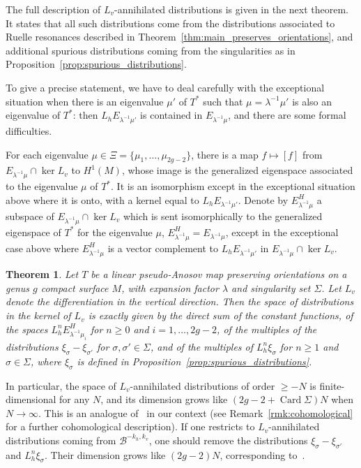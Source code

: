 \documentclass[10pt]{amsart}
\newcommand{\boB}{\mathcal{B}}
\DeclareMathOperator{\Card}{Card}
\newtheorem{thm}{Theorem}[section]
\theoremstyle{definition}
\numberwithin{equation}{section}
\begin{document}
The full description of $L_v$-annihilated distributions is given in the next
theorem. It states that all such distributions come from the distributions
associated to Ruelle resonances described in
Theorem~\ref{thm:main_preserves_orientations}, and additional spurious
distributions coming from the singularities as in
Proposition~\ref{prop:spurious_distributions}.

To give a precise statement, we have to deal carefully with the exceptional
situation when there is an eigenvalue $\mu'$ of $T^*$ such that
$\mu=\lambda^{-1}\mu'$ is also an eigenvalue of $T^*$: then $L_h
E_{\lambda^{-1}\mu'}$ is contained in $E_{\lambda^{-1}\mu}$, and there are
some formal difficulties.

For each eigenvalue $\mu \in \Xi = \{\mu_1,\dotsc, \mu_{2g-2}\}$, there is a
map $f \mapsto [f]$ from $E_{\lambda^{-1}\mu} \cap \ker L_v$ to $H^1(M)$,
whose image is the generalized eigenspace associated to the eigenvalue $\mu$
of $T^*$. It is an isomorphism except in the exceptional situation above
where it is onto, with a kernel equal to $L_h E_{\lambda^{-1}\mu'}$. Denote
by $E_{\lambda^{-1}\mu}^H$ a subspace of $E_{\lambda^{-1}\mu}\cap \ker L_v$
which is sent isomorphically to the generalized eigenspace of $T^*$ for the
eigenvalue $\mu$, \ie $E_{\lambda^{-1}\mu}^H = E_{\lambda^{-1}\mu}$, except
in the exceptional case above where $E_{\lambda^{-1}\mu}^H$ is a vector
complement to $L_h E_{\lambda^{-1}\mu'}$ in $E_{\lambda^{-1}\mu}\cap \ker
L_v$.

\begin{thm}
\label{thm:Lv_invariant_preserves_orientations} Let $T$ be a linear
pseudo-Anosov map preserving orientations on a genus $g$ compact surface $M$,
with expansion factor $\lambda$ and singularity set $\Sigma$. Let $L_v$
denote the differentiation in the vertical direction. Then the space of
distributions in the kernel of $L_v$ is exactly given by the direct sum of
the constant functions, of the spaces $L_h^n E^H_{\lambda^{-1}\mu_i}$ for
$n\geq 0$ and $i=1,\dotsc, 2g-2$, of the multiples of the distributions
$\xi_\sigma - \xi_{\sigma'}$ for $\sigma,\sigma'\in \Sigma$, and of the
multiples of $L_h^n \xi_\sigma$ for $n \geq 1$ and $\sigma \in \Sigma$, where
$\xi_\sigma$ is defined in Proposition~\ref{prop:spurious_distributions}.
\end{thm}

In particular, the space of $L_v$-annihilated distributions of order $\geq
-N$ is finite-dimensional for any $N$, and its dimension grows like $(2g-2 +
\Card \Sigma)N$ when $N\to \infty$. This is an analogue
of~\cite[Th.\,7.7(i)]{forni_deviation} in our context (see
Remark~\ref{rmk:cohomological} for a further cohomological description). If
one restricts to $L_v$-annihilated distributions coming from $\boB^{-k_h,
k_v}$, one should remove the distributions $\xi_\sigma - \xi_{\sigma'}$ and
$L_h^n \xi_\sigma$. Their dimension grows like $(2g-2)N$, corresponding
to~\cite[Th.\,7.7(ii)]{forni_deviation}.
\end{document}
